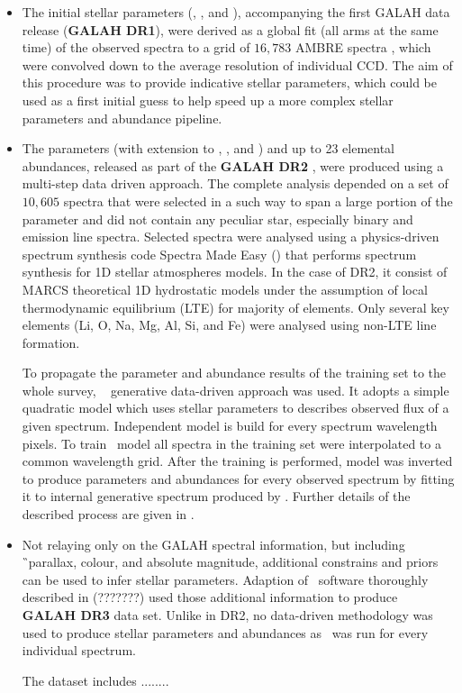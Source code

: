 \begin{itemize}
	\item The initial stellar parameters (\Teff, \Logg, and \Feh), accompanying the first GALAH data release (\textbf{GALAH DR1}), were derived as a global fit (all arms at the same time) of the observed spectra to a grid of $16,783$ AMBRE spectra \citep{2012A&A...544A.126D}, which were convolved down to the average resolution of individual CCD. The aim of this procedure was to provide indicative stellar parameters, which could be used as a first initial guess to help speed up a more complex stellar parameters and abundance pipeline.
	
	\item The parameters (with extension to \vsin, \vmic, and \aks) and up to 23 elemental abundances, released as part of the \textbf{GALAH DR2} \citep{buder2018}, were produced using a multi-step data driven approach. The complete analysis depended on a set of $10,605$ spectra that were selected in a such way to span a large portion of the parameter and did not contain any peculiar star, especially binary and emission line spectra. Selected spectra were analysed using a physics-driven spectrum synthesis code Spectra Made Easy (\SM) \citep{1996A&AS..118..595V, 2017A&A...597A..16P} that performs spectrum synthesis for 1D stellar atmospheres models. In the case of DR2, it consist of MARCS theoretical 1D hydrostatic models \citep{2008A&A...486..951G} under the assumption of local thermodynamic equilibrium (LTE) for majority of elements. Only several key elements (Li, O, Na, Mg, Al, Si, and Fe) were analysed using non-LTE line formation.
	
	To propagate the parameter and abundance results of the training set to the whole survey, \TC\ \citep{2015ApJ...808...16N} generative data-driven approach was used. It adopts a simple quadratic model which uses stellar parameters to describes observed flux of a given spectrum. Independent model is build for every spectrum wavelength pixels. To train \TC\ model all spectra in the training set were interpolated to a common wavelength grid. After the training is performed, model was inverted to produce parameters and abundances for every observed spectrum by fitting it to internal generative spectrum produced by \TC. Further details of the described process are given in \citet{buder2018}.
	
	\item Not relaying only on the GALAH spectral information, but including \G\ parallax, colour, and absolute magnitude, additional constrains and priors can be used to infer stellar parameters. Adaption of \SM\ software thoroughly described in (???????) used those additional information to produce \textbf{GALAH DR3} data set. Unlike in DR2, no data-driven methodology was used to produce stellar parameters and abundances as \SM\ was run for every individual spectrum.
	
	The dataset includes ........
	
\end{itemize}

